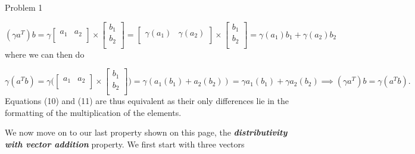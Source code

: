 \begin{problem}{Problem 1}
\begin{highlight}
        \begin{equation}
            (\gamma a^{T})b = \gamma
            \begin{bmatrix}
                a_{1} & a_{2} \\
            \end{bmatrix}
            \times
            \begin{bmatrix}
                b_{1} \\
                b_{2} \\
            \end{bmatrix}
            = 
            \begin{bmatrix}
                \gamma(a_{1}) & \gamma(a_{2}) \\
            \end{bmatrix}
            \times
            \begin{bmatrix}
                b_{1} \\
                b_{2} \\
            \end{bmatrix}
            = \gamma(a_{1})b_{1} + \gamma(a_{2})b_{2}
        \end{equation}
        where we can then do

        \begin{equation}
            \gamma(a^{T}b) = \gamma \Bigg(
            \begin{bmatrix}
                a_{1} & a_{2} \\
            \end{bmatrix}
            \times
            \begin{bmatrix}
                b_{1} \\
                b_{2} \\
            \end{bmatrix}
            \Bigg) = \gamma (a_{1}(b_{1}) + a_{2}(b_{2})) = \gamma a_{1}(b_{1}) + \gamma a_{2}(b_{2}) \implies (\gamma a^{T})b = \gamma(a^{T}b).
        \end{equation}
        Equations (10) and (11) are thus equivalent as their only differences lie in the formatting of the multiplication of the elements.

        We now move on to our last property shown on this page, the \textbf{\textit{distributivity with vector addition}} property. We first start with three vectors


\end{highlight}
\end{problem}
